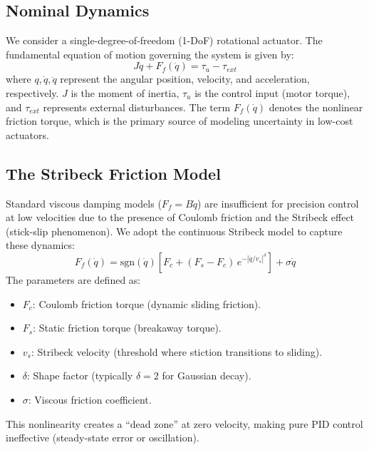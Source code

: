 \documentclass[11pt, a4paper]{article}
\begin{document}
\subsection{Nominal Dynamics}

We consider a single-degree-of-freedom (1-DoF) rotational actuator. The
fundamental equation of motion governing the system is given by:
\begin{equation}
    J \ddot{q} + F_f(\dot{q}) = \tau_{u} - \tau_{ext}
    \label{eq:motion}
\end{equation}
where $q, \dot{q}, \ddot{q}$ represent the angular position, velocity,
and acceleration, respectively. $J$ is the moment of inertia, $\tau_{u}$
is the control input (motor torque), and $\tau_{ext}$ represents external
disturbances. The term $F_f(\dot{q})$ denotes the nonlinear friction
torque, which is the primary source of modeling uncertainty in low-cost
actuators.

\subsection{The Stribeck Friction Model}

Standard viscous damping models ($F_f = B\dot{q}$) are insufficient for
precision control at low velocities due to the presence of Coulomb friction
and the Stribeck effect (stick-slip phenomenon). We adopt the continuous
Stribeck model to capture these dynamics:
\begin{equation}
    F_f(\dot{q}) = \mathrm{sgn}(\dot{q})
        \left[ F_c + (F_s - F_c)\,e^{-|\dot{q}/v_s|^\delta} \right]
        + \sigma \dot{q}
    \label{eq:stribeck}
\end{equation}
The parameters are defined as:
\begin{itemize}
    \item $F_c$: Coulomb friction torque (dynamic sliding friction).
    \item $F_s$: Static friction torque (breakaway torque).
    \item $v_s$: Stribeck velocity (threshold where stiction transitions
          to sliding).
    \item $\delta$: Shape factor (typically $\delta = 2$ for Gaussian
          decay).
    \item $\sigma$: Viscous friction coefficient.
\end{itemize}
This nonlinearity creates a ``dead zone'' at zero velocity, making pure
PID control ineffective (steady-state error or oscillation).
\end{document}

